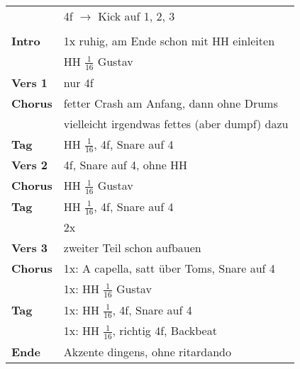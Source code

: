 
\begin{tabular}{p{1.6cm}l}
	                & 4f $\rightarrow$ Kick auf 1, 2, 3             \\
	                &                                               \\
	\textbf{Intro}  & 1x ruhig, am Ende schon mit HH einleiten      \\
	                & HH $\frac{1}{16}$ Gustav                      \\
	\textbf{Vers 1} & nur 4f                                        \\
	\textbf{Chorus} & fetter Crash am Anfang, dann ohne Drums       \\
	                & vielleicht irgendwas fettes (aber dumpf) dazu \\
	\textbf{Tag}    & HH $\frac{1}{16}$, 4f, Snare auf 4            \\
	\textbf{Vers 2} & 4f, Snare auf 4, ohne HH                      \\
	\textbf{Chorus} & HH $\frac{1}{16}$ Gustav                      \\
	\textbf{Tag}    & HH $\frac{1}{16}$, 4f, Snare auf 4            \\
	                & 2x                                            \\
	\textbf{Vers 3} & zweiter Teil schon aufbauen                   \\
	\textbf{Chorus} & 1x: A capella, satt über Toms, Snare auf 4    \\
	                & 1x: HH $\frac{1}{16}$ Gustav                  \\
	\textbf{Tag}    & 1x: HH $\frac{1}{16}$, 4f, Snare auf 4        \\
	                & 1x: HH $\frac{1}{16}$, richtig 4f, Backbeat   \\
	\textbf{Ende}   & Akzente dingens, ohne ritardando              \\
\end{tabular}

